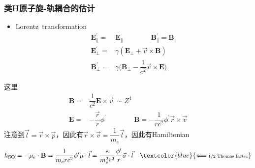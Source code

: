 \frame
{
	\frametitle{类\textrm{H}原子旋-轨耦合的估计}
	\begin{itemize}
		\item \textrm{Lorentz~transformation}
			\begin{displaymath}
				\begin{aligned}
					\mathbf{E}_{\parallel}^{\prime}=&\mathbf{E}_{\parallel}\qquad\qquad \mathbf{B}_{\parallel}^{\prime}=\mathbf{B}_{\parallel}\\
					\mathbf{E}_{\perp}^{\prime}=&\gamma(\mathbf{E}_{\perp}+\vec v\times\mathbf{B})\\
					\mathbf{B}_{\perp}^{\prime}=&\gamma\bigg(\mathbf{B}_{\perp}-\dfrac1{c^2}\vec v\times\mathbf{E}\bigg)
				\end{aligned}
			\end{displaymath}
	\end{itemize}
	这里
	\begin{displaymath}
		\begin{aligned}
			\mathbf{B}=&\dfrac1{c^2}\mathbf{E}\times\vec v~\sim Z^4\\
			\mathbf{E}=&-\dfrac{\vec r}r\phi^{\prime}\qquad\qquad \mathbf{B}=-\dfrac1{rc^2}\phi^{\prime}\vec r\times\vec v
		\end{aligned}
	\end{displaymath}
	注意到$\vec l=\vec r\times\vec p$，因此有$\vec r\times\vec v=\dfrac1{m_e}\vec l$，因此有\textrm{Hamiltonian}
	\begin{displaymath}
		h_{\mathrm{SO}}=-\mu_{e}\cdot\mathbf{B}=\dfrac1{m_erc^2}\phi^{\prime}\mu\cdot\vec l=\dfrac{e}{m_e^2c^2}\dfrac{\phi^{\prime}}r\vec\sigma\cdot\vec l \quad\textcolor{blue}{\Longleftarrow\mbox{\textrm{\fontsize{6.5pt}{5.2pt}\selectfont{1/2~Thomas~factor}}}}
	\end{displaymath}
}

